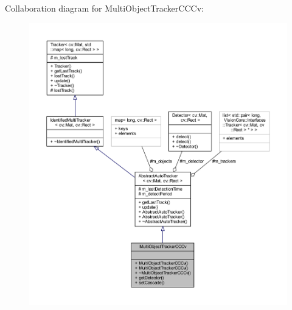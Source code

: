Collaboration diagram for Multi\+Object\+Tracker\+C\+C\+Cv\+:
\nopagebreak
\begin{figure}[H]
\begin{center}
\leavevmode
\includegraphics[width=350pt]{class_viscv_1_1_multi_object_tracker_c_c_cv__coll__graph}
\end{center}
\end{figure}
